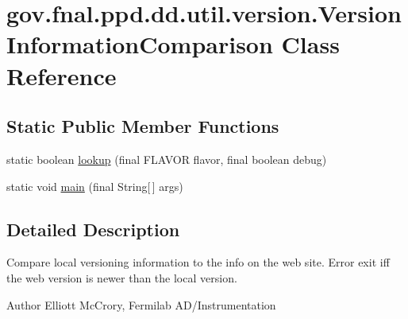 \hypertarget{classgov_1_1fnal_1_1ppd_1_1dd_1_1util_1_1version_1_1VersionInformationComparison}{\section{gov.\-fnal.\-ppd.\-dd.\-util.\-version.\-Version\-Information\-Comparison Class Reference}
\label{classgov_1_1fnal_1_1ppd_1_1dd_1_1util_1_1version_1_1VersionInformationComparison}
}
\subsection*{Static Public Member Functions}
\begin{DoxyCompactItemize}
\item 
static boolean \hyperlink{classgov_1_1fnal_1_1ppd_1_1dd_1_1util_1_1version_1_1VersionInformationComparison_af1c5f9dd0b50c3fea2a6d7bb08992abb}{lookup} (final F\-L\-A\-V\-O\-R flavor, final boolean debug)
\item 
static void \hyperlink{classgov_1_1fnal_1_1ppd_1_1dd_1_1util_1_1version_1_1VersionInformationComparison_a34491a10aba931aef023f65cc0a63d00}{main} (final String\mbox{[}$\,$\mbox{]} args)
\end{DoxyCompactItemize}


\subsection{Detailed Description}
Compare local versioning information to the info on the web site. Error exit iff the web version is newer than the local version.

\begin{DoxyAuthor}{Author}
Elliott Mc\-Crory, Fermilab A\-D/\-Instrumentation 
\end{DoxyAuthor}


